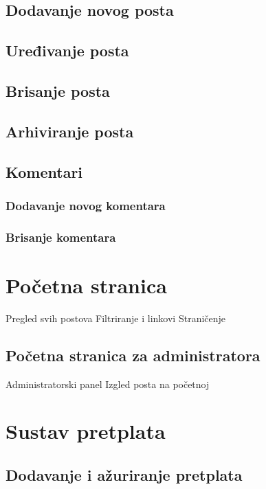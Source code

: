 \documentclass[times, utf8, zavrsni]{fer}
\begin{document}
\subsection{Dodavanje novog posta}

\subsection{Uređivanje posta}

\subsection{Brisanje posta}

\subsection{Arhiviranje posta}

\subsection{Komentari}

\subsubsection{Dodavanje novog komentara}

\subsubsection{Brisanje komentara}

\section{Početna stranica}

Pregled svih postova
Filtriranje i linkovi
Straničenje

\subsection{Početna stranica za administratora}

Administratorski panel
Izgled posta na početnoj

\section{Sustav pretplata}

\subsection{Dodavanje i ažuriranje pretplata}
\end{document}
